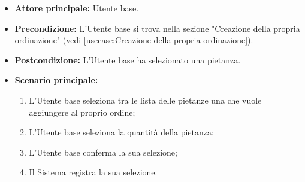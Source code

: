 \label{usecase:Seleziona pietanza}
\begin{itemize}
	\item \textbf{Attore principale:} Utente base.

	\item \textbf{Precondizione:} L'Utente base si trova nella sezione "Creazione della propria ordinazione" (vedi \autoref{usecase:Creazione della propria ordinazione}).

	\item \textbf{Postcondizione:} L'Utente base ha selezionato una pietanza.

	\item \textbf{Scenario principale:}
	      \begin{enumerate}
		      \item L'Utente base seleziona tra le lista delle pietanze una che vuole aggiungere al proprio ordine;
		      \item L'Utente base seleziona la quantità della pietanza;
		      \item L'Utente base conferma la sua selezione;
		      \item Il Sistema registra la sua selezione.
	      \end{enumerate}
\end{itemize}
